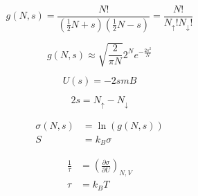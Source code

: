 \documentclass[12pt]{article}
\begin{document}
\begin{multicols}{2}

  \begin{equation*}
    g(N,s)=\frac{N!}{\left(\frac{1}{2}N+s\right)\left( \frac{1}{2}N-s \right)}=\frac{N!}{N_{\uparrow}!N_{\downarrow}!}
  \end{equation*}

  \begin{equation*}
    g(N,s)\approx \sqrt{\frac{2}{\pi N}}2^Ne^{-\frac{2s^2}{N}}
  \end{equation*}

\end{multicols}

\vspace{-20pt}

\begin{multicols}{2}

  \begin{equation*}
    U(s)=-2smB
  \end{equation*}
    
  \begin{equation*}
    2s=N_{\uparrow}-N_{\downarrow}
  \end{equation*}

\end{multicols}

\vspace{-30pt}

\begin{multicols}{2}

  \begin{equation*}
    \begin{split}
    \sigma(N,s)&=\ln(g(N,s))\\
    S&=k_B\sigma
    \end{split}
  \end{equation*}
    
  \begin{equation*}
    \begin{split}
      \frac{1}{\tau}&=\left( \frac{\partial \sigma}{\partial U} \right)_{N,V}\\
      \tau&=k_BT
    \end{split}
  \end{equation*}

\end{multicols}

\vspace{-30pt}
\end{document}
